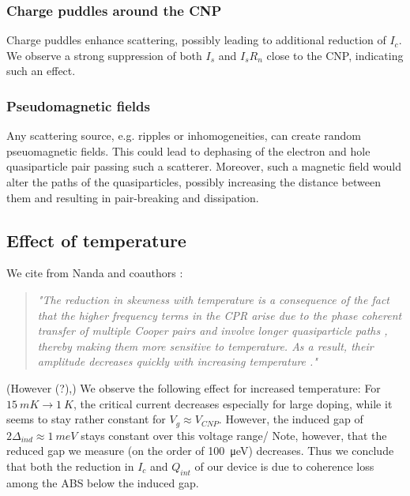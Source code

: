 \subsubsection{Charge puddles around the CNP}
Charge puddles enhance scattering, possibly leading to additional reduction of $I_c$. We observe a strong suppression of both $I_s$ and $I_s R_n$ close to the CNP, indicating such an effect.

\subsubsection{Pseudomagnetic fields}
Any scattering source, e.g. ripples or inhomogeneities, can create random pseuomagnetic fields. This could lead to dephasing of the electron and hole quasiparticle pair passing such a scatterer. Moreover, such a magnetic field would alter the paths of the quasiparticles, possibly increasing the distance between them and resulting in pair-breaking and dissipation.


\subsection{Effect of temperature}
We cite from Nanda and coauthors \cite{nanda_current-phase_2017}:
\begin{quotation}
	\textit{"The reduction in skewness with temperature is a consequence of the fact that the higher frequency terms in the CPR arise due to the phase coherent transfer of multiple Cooper pairs and involve longer quasiparticle paths \cite{heikkila_supercurrent-carrying_2002}, thereby making them more sensitive to temperature. As a result, their amplitude decreases quickly with increasing temperature \cite{hagymasi_josephson_2010,black-schaffer_strongly_2010,rakyta_magnetic_2016,english_observation_2016}."}
\end{quotation}

(However (?),) We observe the following effect for increased temperature: For $\SI{15}{mK}\rightarrow\SI{1}{K}$, the critical current decreases especially for large doping, while it seems to stay rather constant for $V_g\approx V_{CNP}$. However, the induced gap of $2\Delta_{ind}\approx\SI{1}{meV}$ stays constant over this voltage range/ Note, however, that the reduced gap we measure (on the order of \SI{100}{\micro eV}) decreases. Thus we conclude that both the reduction in $I_c$ and $Q_{int}$ of our device is due to coherence loss among the ABS below the induced gap.